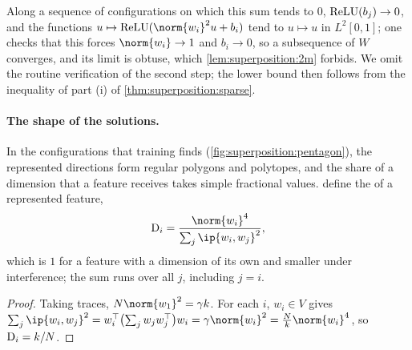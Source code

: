 \begin{refsection}

\begin{proofsketch}
Along a sequence of configurations on which this sum tends to $0$, $\operatorname{ReLU}(b_j)\to0$, and the functions $u\mapsto\relu(\norm{w_i}^2u+b_i)$ tend to $u\mapsto u$ in $L^2[0,1]$; one checks that this forces $\norm{w_i}\to1$ and $b_i\to0$, so a subsequence of $W$ converges, and its limit is obtuse, which \cref{lem:superposition:2m} forbids. We omit the routine verification of the second step; the lower bound then follows from the inequality of part (i) of \cref{thm:superposition:sparse}.
\end{proofsketch}

\paragraph{The shape of the solutions.} In the configurations that training finds (\cref{fig:superposition:pentagon}), the represented directions form regular polygons and polytopes, and the share of a dimension that a feature receives takes simple fractional values. \Textcite{ElhageEtAl2022} define the  of a represented feature,
\[
  \supD_i=\frac{\norm{w_i}^4}{\sum_{j}\ip{w_i,w_j}^2},
\]
which is $1$ for a feature with a dimension of its own and smaller under interference; the sum runs over all $j$, including $j=i$.


\begin{proof}
Taking traces, $N\norm{w_1}^2=\gamma k$. For each $i$, $w_i\in V$ gives $\sum_j\ip{w_i,w_j}^2=w_i^\top\bigl(\sum_jw_jw_j^\top\bigr)w_i=\gamma\norm{w_i}^2=\frac Nk\norm{w_i}^4$, so $\mathrm{D}_i=k/N$.
\end{proof}


\end{refsection}

